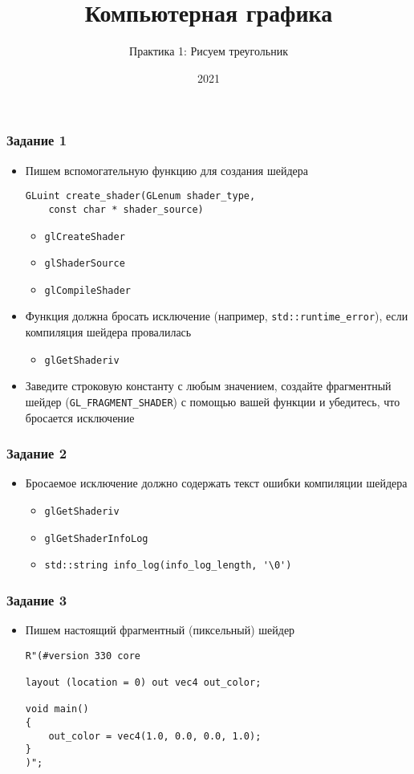 \documentclass{beamer}
\title{Компьютерная графика}
\subtitle{Практика 1: Рисуем треугольник}
\date{2021}
\begin{document}
\frame{\titlepage}

\begin{frame}[fragile]
\frametitle{Задание 1}
\begin{itemize}
\item Пишем вспомогательную функцию для создания шейдера
\begin{verbatim}
GLuint create_shader(GLenum shader_type,
    const char * shader_source)
\end{verbatim}
\pause
\begin{itemize}
\item \verb|glCreateShader|
\item \verb|glShaderSource|
\item \verb|glCompileShader|
\end{itemize}
\pause
\item Функция должна бросать исключение (например, \verb|std::runtime_error|), если компиляция шейдера провалилась
\begin{itemize}
\item \verb|glGetShaderiv|
\end{itemize}
\pause
\item Заведите строковую константу с любым значением, создайте фрагментный шейдер (\verb|GL_FRAGMENT_SHADER|) с помощью вашей функции и убедитесь, что бросается исключение
\end{itemize}
\end{frame}

\begin{frame}[fragile]
\frametitle{Задание 2}
\begin{itemize}
\item Бросаемое исключение должно содержать текст ошибки компиляции шейдера
\pause
\begin{itemize}
\item \verb|glGetShaderiv|
\item \verb|glGetShaderInfoLog|
\item \verb|std::string info_log(info_log_length, '\0')|
\end{itemize}
\end{itemize}
\end{frame}

\begin{frame}[fragile]
\frametitle{Задание 3}
\begin{itemize}
\item Пишем настоящий фрагментный (пиксельный) шейдер
\pause
\begin{verbatim}
R"(#version 330 core

layout (location = 0) out vec4 out_color;

void main()
{
    out_color = vec4(1.0, 0.0, 0.0, 1.0);
}
)";
\end{verbatim}
\end{itemize}
\end{frame}
\end{document}
